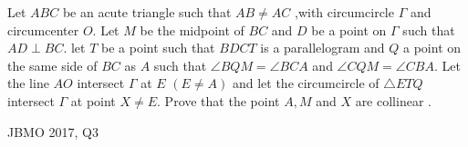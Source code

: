 Let  $ABC $ be an acute triangle such that $AB\neq AC$ ,with circumcircle $ \Gamma$ and circumcenter $O$. Let $M$ be the midpoint of $BC$ and $D$ be a point on $ \Gamma$ such that $AD \perp  BC$. let $T$ be a point such that $BDCT$ is a parallelogram  and $Q$ a point on the same side of  $BC$ as $A$ such that $\angle{BQM}=\angle{BCA}$ and  $\angle{CQM}=\angle{CBA}$. Let the line $AO$ intersect $ \Gamma$ at $E$ $(E\neq A)$ and let the circumcircle of $\triangle ETQ$  intersect $ \Gamma$ at point $X\neq E$. Prove that the point $A,M$ and $X$ are collinear .

JBMO 2017, Q3